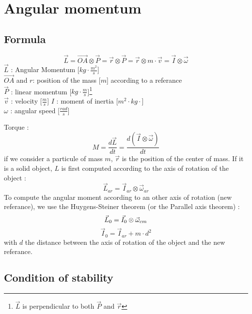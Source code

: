\documentclass[12pt,a4paper]{article}
\begin{document}
\newpage
\section{Angular momentum}

\subsection{Formula}
\begin{equation}
\vec{L}=\vec{OA} \otimes \vec{P}=\vec{r} \otimes \vec{P}=\vec{r} \otimes m \cdot \vec{v}=\vec{I} \otimes \vec{\omega}
\end{equation}
$\vec{L}$ : Angular Momentum [$kg \cdot \frac{m^2}{s}$]\\
$\vec{OA}$ and $r$: position of the mass [$m$] according to a referance\\
$\vec{P}$ : linear momentum [$kg\cdot \frac{m}{s}$]\footnote{$\vec{L}$ is perpendicular to both $\vec{P}$ and $\vec{r}$}\\
$\vec{v}$ : velocity [$\frac{m}{s}$]
$I$ : moment of inertia [$m^2 \cdot kg \cdot$]\\
$\omega$ : angular speed [$\frac{rad}{s}$]

Torque : 
\begin{equation}
M = \frac{d\vec{L}}{dt}=\frac{d(\vec{I} \otimes \vec{\omega})}{dt}
\end{equation}
\medbreak
if we consider a particule of mass $m$, $\vec{r}$ is the position of the center of mass.
If it is a solid object, $L$ is first computed according to the axis of rotation of the object : 
\begin{equation}
\vec{L}_{ar}=\vec{I}_{ar} \otimes \vec{\omega}_{ar}
\end{equation}
To compute the angular moment according to an other axis of rotation (new referance), we use the Huygens-Steiner theorem (or the Parallel axis theorem) : 
\begin{equation}
\vec{L}_{0}=\vec{I}_{0} \otimes \vec{\omega}_{cm}\\
\end{equation}
\begin{equation}
\vec{I}_{0} = \vec{I}_{ar} + m\cdot d^2
\end{equation}
with $d$ the distance between the axis of rotation of the object and the new referance. 
\subsection{Condition of stability}
\end{document}
